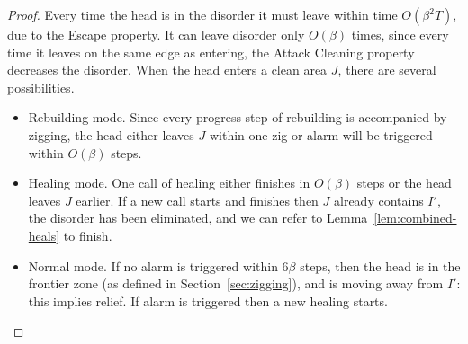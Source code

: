 \documentclass[11pt]{memoir}
\theoremstyle{definition} %
\newcommand{\Tu}{T}
\begin{document}
\begin{proof}
Every time the head is in the disorder it must leave within time \( O(\beta^{2}\Tu) \),
due to the Escape property.
It can leave disorder only \( O(\beta) \) times, since every time it leaves on the
same edge as entering, the Attack Cleaning property decreases the disorder.
When the head enters a clean area \( J \), there are several possibilities.

\begin{itemize}
\item Rebuilding mode.
  Since every progress step of rebuilding is accompanied by zigging,
  the head either leaves \( J \) within one zig or alarm will be triggered within \( O(\beta) \) steps.
\item Healing mode.
  One call of healing either finishes in \( O(\beta) \) steps or the head leaves \( J \) earlier.
  If a new call starts and finishes then \( J \) already contains \( I' \), the disorder has been
  eliminated, and we can refer to Lemma~\ref{lem:combined-heals} to finish.
\item Normal mode.
  If no alarm is triggered within \( 6\beta \) steps, then the head is in the frontier zone
  (as defined in Section~\ref{sec:zigging}), and is moving  away from \( I' \): this implies relief.
  If alarm is triggered then a new healing starts.
\end{itemize}


\end{proof}
\end{document}
